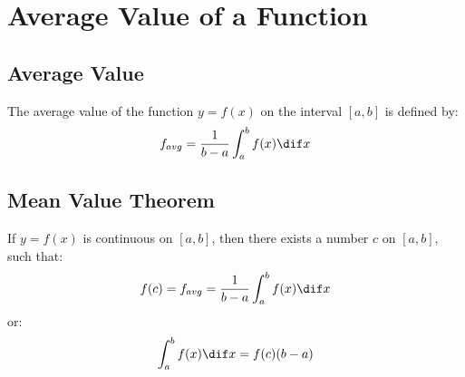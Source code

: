 \section{Average Value of a Function}
\subsection{Average Value}
	The average value of the function $y=f(x)$ on the interval $[a,b]$ is defined by:
	\[f_{avg} = \frac{1}{b-a} \int_a^b f(x) \dif x\]
\subsection{Mean Value Theorem}
	If $y=f(x)$ is continuous on $[a,b]$, then there exists a number $c$ on $[a,b]$, such that:
	\[f(c) = f_{avg} = \frac{1}{b-a} \int_a^b f(x) \dif x\]
	or:
	\[\int_a^b f(x) \dif x = f(c) (b-a)\]
